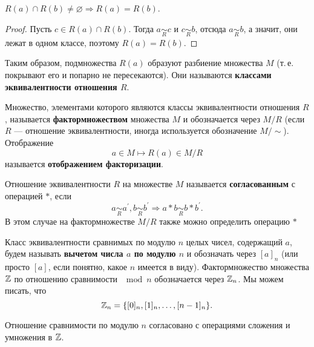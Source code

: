 \begin{lemma}
    $R(a) \cap R(b) \ne \varnothing \Rightarrow R(a) = R(b)$.
\end{lemma}

\begin{proof}
    Пусть $c \in R(a) \cap R(b)$. Тогда $a \underset{R}{\sim} c$ и $c \underset{R}{\sim} b$, отсюда $a \underset{R}{\sim} b$, а значит, они лежат в одном классе, поэтому $R(a) = R(b)$.
\end{proof}

\begin{definition}
    Таким образом, подмножества $R(a)$ образуют разбиение множества $M$ (т.\,е. покрывают его и попарно не пересекаются). Они называются \textbf{классами эквивалентности отношения $R$}.
\end{definition}

\begin{definition}
    Множество, элементами которого являются классы эквивалентности отношения $R$, называется \textbf{фактормножеством} множества $M$ и обозначается через $M / R$ (если $R$ --- отношение эквивалентности, иногда используется обозначение $M / \sim$). Отображение
    $$
    a \in M \mapsto R(a) \in M / R
    $$
    называется \textbf{отображением факторизации}.
\end{definition}

\begin{definition}
    Отношение эквивалентности $R$ на множестве $M$ называется \textbf{согласованным} с операцией $\ast$, если
    $$
    a \underset{R}{\sim} a^\prime, b \underset{R}{\sim} b^\prime \Rightarrow a \ast b \underset{R}{\sim} b \ast b^\prime.
    $$
    В этом случае на фактормножестве $M / R$ также можно определить операцию $\ast$
\end{definition}

\begin{definition}
    Класс эквивалентности сравнимых по модулю $n$ целых чисел, содержащий $a$, будем называть \textbf{вычетом числа $a$ по модулю $n$} и обозначать через $[a]_n$ (или просто $[a]$, если понятно, какое $n$ имеется в виду). Фактормножество множества $\mathbb{Z}$ по отношению сравнимости $\mod n$ обозначается через $\mathbb{Z}_n$. Мы можем писать, что
    $$
    \mathbb{Z}_n = \{[0]_n, [1]_n, \ldots, [n - 1]_n\}.
    $$
\end{definition}

\begin{lemma}
    Отношение сравнимости по модулю $n$ согласовано с операциями сложения и умножения в $\mathbb{Z}$.
\end{lemma}

